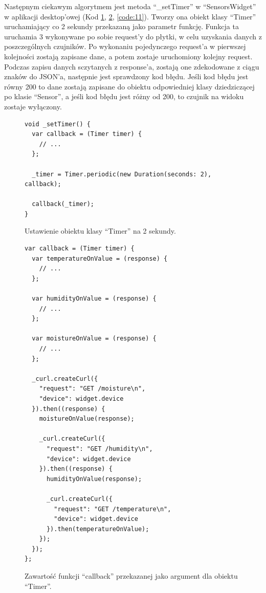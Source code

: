 \documentclass[a4paper,twoside,12pt]{book}
\begin{document}
\newpage

Następnym ciekawym algorytmem jest metoda ``\_setTimer'' w ``SensorsWidget'' w aplikacji desktop'owej (Kod \ref{code:9}, \ref{code:10}, \ref{code:11}). Tworzy ona obiekt klasy ``Timer'' uruchamiający co 2 sekundy przekazaną jako parametr funkcję. Funkcja ta uruchamia 3 wykonywane po sobie request'y do płytki, w celu uzyskania danych z poszczególnych czujników. Po wykonaniu pojedynczego request'a w pierwszej kolejności zostają zapisane dane, a potem zostaje uruchomiony kolejny request. Podczas zapisu danych sczytanych z response'a, zostają one zdekodowane z ciągu znaków do JSON'a, następnie jest sprawdzony kod błędu. Jeśli kod błędu jest równy 200 to dane zostają zapisane do obiektu odpowiedniej klasy dziedziczącej po klasie ``Sensor'', a jeśli kod błędu jest różny od 200, to czujnik na widoku zostaje wyłączony.

\begin{figure}[H]
   \centering
   \footnotesize
   \begin{lstlisting}
void _setTimer() {
  var callback = (Timer timer) {
    // ...
  };

  _timer = Timer.periodic(new Duration(seconds: 2), callback);

  callback(_timer);
}
   \end{lstlisting}
   \caption{Ustawienie obiektu klasy ``Timer'' na 2 sekundy.}
   \label{code:9}
\end{figure}

\begin{figure}[H]
   \centering
   \footnotesize
   \begin{lstlisting}
var callback = (Timer timer) {
  var temperatureOnValue = (response) {
    // ...
  };

  var humidityOnValue = (response) {
    // ...
  };

  var moistureOnValue = (response) {
    // ...
  };

  _curl.createCurl({
    "request": "GET /moisture\n",
    "device": widget.device
  }).then((response) {
    moistureOnValue(response);

    _curl.createCurl({
      "request": "GET /humidity\n",
      "device": widget.device
    }).then((response) {
      humidityOnValue(response);

      _curl.createCurl({
        "request": "GET /temperature\n",
        "device": widget.device
      }).then(temperatureOnValue);
    });
  });
};
   \end{lstlisting}
   \caption{Zawartość funkcji ``callback'' przekazanej jako argument dla obiektu ``Timer''.}
   \label{code:10}
\end{figure}
\end{document}
